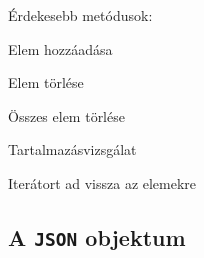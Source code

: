 \begin{frame}
  Érdekesebb metódusok:
  \begin{description}[m]
    \item[\texttt{add()}] Elem hozzáadása
    \item[\texttt{delete()}] Elem törlése
    \item[\texttt{clear()}] Összes elem törlése
    \item[\texttt{has()}] Tartalmazásvizsgálat
    \item[\texttt{values()}] Iterátort ad vissza az elemekre
  \end{description}
\end{frame}

\begin{frame}
  \begin{exampleblock}{}
    \footnotesize
    
  \end{exampleblock}
\end{frame}

\begin{frame}
  \begin{exampleblock}{}
    \footnotesize
    
  \end{exampleblock}
\end{frame}

\subsection{A \texttt{JSON} objektum}

